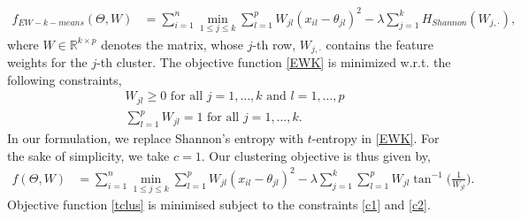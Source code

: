 \documentclass{article}
\begin{document}
\begin{align}
f_{EW-k-means}(\Theta,W) & =\sum_{i=1}^n \min_{1 \leq j \leq k} \sum_{l=1}^p W_{jl}  (x_{il}-\theta_{jl})^2-\lambda \sum_{j=1}^kH_{Shannon}(W_{j,\cdot}), \label{EWK}
\end{align}
where $W \in \mathbb{R}^{k \times p}$ denotes the matrix, whose $j$-th row, $W_{j,\cdot}$ contains the feature weights for the $j$-th cluster. The objective function \eqref{EWK} is minimized w.r.t. the following constraints,
\begin{align}
&W_{jl} \geq 0 \text{ for all } j=1,\dots,k \text{ and }  l=1,\dots,p \label{c1}\\
&\sum_{l=1}^pW_{jl}=1 \text{ for all } j=1,\dots,k. \label{c2}
\end{align}
In our formulation, we replace Shannon's entropy with $t$-entropy in \eqref{EWK}. For the sake of simplicity, we take $c=1$. Our clustering objective is thus given by, 
\begin{align}
f(\Theta,W) & =\sum_{i=1}^n \min_{1 \leq j \leq k} \sum_{l=1}^p W_{jl} (x_{il}-\theta_{jl})^2-\lambda \sum_{j=1}^k\sum_{l=1}^{p} W_{jl}\tan^{-1}\bigg(\frac{1}{W_{jl}}\bigg). \label{tclus}
\end{align}
Objective function \eqref{tclus} is minimised subject to the constraints \eqref{c1} and \eqref{c2}.\par
\end{document}
